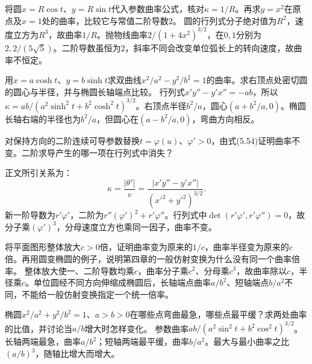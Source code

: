 将圆\(x=R\cos t\)、\(y=R\sin t\)代入参数曲率公式，核对\(\kappa=1/R\)。再求\(y=x^2\)在原点及\(x=1\)处的曲率，比较它与常值二阶导数\(2\)。
\solutionanswer
圆的行列式分子绝对值为\(R^2\)，速度立方为\(R^3\)，故曲率\(1/R\)。抛物线曲率\(2/(1+4x^2)^{3/2}\)，在\(0,1\)分别为\(2,2/(5\sqrt5)\)。二阶导数虽恒为\(2\)，斜率不同会改变单位弧长上的转向速度，故曲率不恒定。


用\(x=a\cosh t\)、\(y=b\sinh t\)求双曲线\(x^2/a^2-y^2/b^2=1\)的曲率。求右顶点处密切圆的圆心与半径，并与椭圆长轴端点比较。
\solutionanswer
行列式\(x'y''-y'x''=-ab\)，所以\(\kappa=ab/(a^2\sinh^2t+b^2\cosh^2t)^{3/2}\)。右顶点半径\(b^2/a\)，圆心\((a+b^2/a,0)\)。椭圆长轴右端的半径也为\(b^2/a\)，但圆心在\((a-b^2/a,0)\)，弯曲方向相反。


对保持方向的二阶连续可导参数替换\(t=\varphi(u)\)、\(\varphi'>0\)，由式\textup{(5.54)}证明曲率不变。二阶求导产生的哪一项在行列式中消失？

\par\smallskip\noindent 正文所引关系为：
\begin{equation*}
\kappa=\frac{|\theta'|}{v}
 =\frac{|x'y''-y'x''|}{(x'^2+y'^2)^{3/2}}.
\end{equation*}
\solutionanswer
新一阶导数为\(r'\varphi'\)，二阶为\(r''(\varphi')^2+r'\varphi''\)。行列式中\(\det(r'\varphi',r'\varphi'')=0\)，故分子乘\((\varphi')^3\)，分母速度立方也乘同一因子，曲率不变。


将平面图形整体放大\(c>0\)倍，证明曲率变为原来的\(1/c\)，曲率半径变为原来的\(c\)倍。再用圆变椭圆的例子，说明第四章的一般仿射变换为什么没有同一个曲率倍率。
\solutionanswer
整体放大使一、二阶导数均乘\(c\)，曲率分子乘\(c^2\)、分母乘\(c^3\)，故曲率除以\(c\)，半径乘\(c\)。单位圆经不同方向伸缩成椭圆后，长轴端点曲率\(a/b^2\)、短轴端点\(b/a^2\)不同，不能给一般仿射变换指定一个统一倍率。


椭圆\(x^2/a^2+y^2/b^2=1\)、\(a>b>0\)在哪些点弯曲最急，哪些点最平缓？求两处曲率的比值，并讨论当\(a/b\)增大时怎样变化。
\solutionanswer
参数曲率\(ab/(a^2\sin^2t+b^2\cos^2t)^{3/2}\)。长轴两端最急，曲率\(a/b^2\)；短轴两端最平缓，曲率\(b/a^2\)。最大与最小曲率之比\((a/b)^3\)，随轴比增大而增大。


